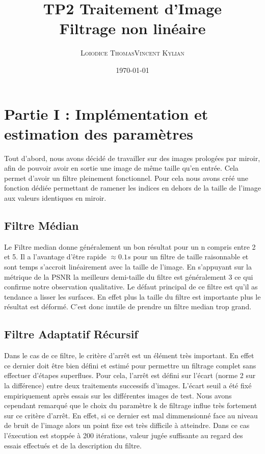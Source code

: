 \documentclass[a4,12pt]{article}
\title{\textbf{TP2 Traitement d'Image\\Filtrage non linéaire}}
\author{
\begin{tabular}{cc}
	\textsc{Loiodice Thomas} & \textsc{Vincent Kylian} \\
\end{tabular}}
\date{\small \today}
\begin{document}
\maketitle



\section{Partie I : Implémentation et estimation des paramètres}

Tout d'abord, nous avons décidé de travailler sur des images prologées par miroir, afin de pouvoir avoir en sortie une image de même taille qu'en entrée. Cela permet d'avoir un filtre pleinement fonctionnel. Pour cela nous avons créé une fonction dédiée permettant de ramener les indices en dehors de la taille de l'image aux valeurs identiques en miroir.

\subsection{Filtre Médian}

Le Filtre median donne généralement un bon résultat pour un n
compris entre 2 et 5. Il a l'avantage d'être rapide $ \approx 0.1 s $
pour un filtre de taille raisonnable et sont temps s'accroit linéairement 
avec la taille de l'image.
En s'appuyant sur la métrique de la PSNR la meilleurs demi-taille du filtre est généralement 3 
ce qui confirme notre observation qualitative. 
Le défaut principal de ce filtre est qu'il as tendance a lisser les surfaces. 
En effet plus la taille du filtre est importante plus le résultat est déformé.
C'est donc inutile de prendre un filtre median trop grand.

\subsection{Filtre Adaptatif Récursif}
Dans le cas de ce filtre, le critère d'arrêt est un élément très important. En effet ce dernier doit être bien défini et estimé pour permettre un filtrage complet sans effectuer d'étapes superflues. Pour cela, l'arrêt est défini sur l'écart (norme 2 sur la différence) entre deux traitements successifs d'images. L'écart seuil a été fixé empiriquement après essais sur les différentes images de test. Nous avons cependant remarqué que le choix du paramètre k de filtrage influe très fortement sur ce critère d'arrêt. En effet, si ce dernier est mal dimmensionné face au niveau de bruit de l'image alors un point fixe est très difficile à atteindre. Dans ce cas l'éxecution est stoppée à 200 itérations, valeur jugée suffisante au regard des essais effectués et de la description du filtre.\\
\end{document}
